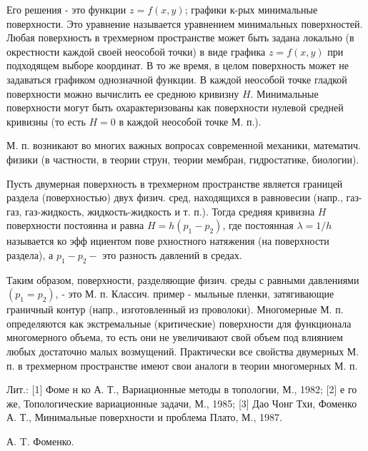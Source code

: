 \documentclass[10pt]{article}
\begin{document}
Его решения - это функции $z=f(x, y)$; графики к-рых минимальные поверхности. Это уравнение называется уравнением минимальных поверхностей. Любая поверхность в трехмерном пространстве может быть задана локально (в окрестности каждой своей неособой точки) в виде графика $z=f(x, y)$ при подходящем выборе координат. В то же время, в целом поверхность может не задаваться графиком однозначной функции. В каждой неособой точке гладкой поверхности можно вычислить ее среднюю кривизну $H$. Минимальные поверхности могут быть охарактеризованы как поверхности нулевой средней кривизны (то есть $H=0$ в каждой неособой точке М. п.).



М. п. возникают во многих важных вопросах современной механики, математич. физики (в частности, в теории струн, теории мембран, гидростатике, биологии).



Пусть двумерная поверхность в трехмерном пространстве является границей раздела (поверхностью) двух физич. сред, находящихся в равновесии (напр., газ-газ, газ-жидкость, жидкость-жидкость и т. п.). Тогда средняя кривизна $H$ поверхности постоянна и равна $H=h\left(p_{1}-p_{2}\right)$, где постоянная $\lambda=1 / h$ называется ко эфф ициентом пове рхностного натяжения (на поверхности раздела), а $p_{1}-p_{2}-$ это разность давлений в средах.



Таким образом, поверхности, разделяющие физич. среды с равными давлениями $\left(p_{1}=p_{2}\right)$, - это М. п. Классич. пример - мыльные пленки, затягивающие граничный контур (напр., изготовленный из проволоки). Многомерные М. п. определяются как экстремальные (критические) поверхности для функционала многомерного объема, то есть они не увеличивают свой объем под влиянием любых достаточно малых возмущений. Практически все свойства двумерных М. п. в трехмерном пространстве имеют свои аналоги в теории многомерных М. п.



Лит.: [1] Фоме н ко А. Т., Вариационные методы в топологии, М., 1982; [2] е го же, Топологические вариационные задачи, М., 1985; [3] Дао Чонг Тхи, Фоменко А. Т., Минимальные поверхности и проблема Плато, М., 1987.



А. T. Фоменко.
\end{document}
